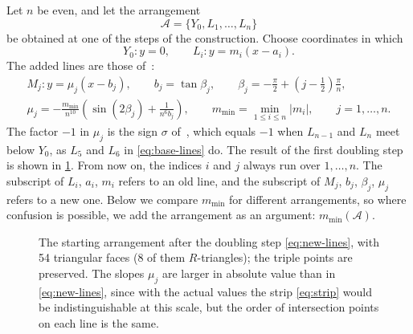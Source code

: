 Let $n$ be even, and let the arrangement
\[
\mathcal A=\{Y_0,L_1,\ldots,L_n\}
\]
be obtained at one of the steps of the construction. Choose coordinates in which
\[
Y_0:y=0,
\qquad
L_i:y=m_i(x-a_i).
\]
The added lines are those of~\cite[Prop.~3.1]{bbl}:
\begin{equation}\label{eq:new-lines}
\begin{gathered}
M_j:y=\mu_j\left(x-b_j\right),
\qquad
b_j=\tan\beta_j,
\qquad
\beta_j=-\frac\pi2+\left(j-\frac12\right)\frac\pi n,\\
\mu_j=-\frac{m_{\min}}{n^{10}}
\left(\sin(2\beta_j)+\frac1{n^6b_j}\right),
\qquad
m_{\min}=\min_{1\le i\le n}|m_i|,
\qquad
j=1,\ldots,n.
\end{gathered}
\end{equation}
The factor $-1$ in $\mu_j$ is the sign $\sigma$ of~\cite[Prop.~3.1]{bbl}, which equals $-1$ when $L_{n-1}$ and $L_n$ meet below $Y_0$, as $L_5$ and $L_6$ in \eqref{eq:base-lines} do.
The result of the first doubling step is shown in \cref{fig:double}.
From now on, the indices $i$ and $j$ always run over $1,\ldots,n$. The subscript of $L_i$, $a_i$, $m_i$ refers to an old line, and the subscript of $M_j$, $b_j$, $\beta_j$, $\mu_j$ refers to a new one.
Below we compare $m_{\min}$ for different arrangements, so where confusion is possible, we add the arrangement as an argument: $m_{\min}(\mathcal A)$.

\begin{figure}[t]
\centering
\resizebox{\ifdim\width>\linewidth\linewidth\else\width\fi}{!}{}
\caption{The starting arrangement after the doubling step \eqref{eq:new-lines}, with 54 triangular faces (8 of them $R$-triangles); the triple points are preserved.
The slopes $\mu_j$ are larger in absolute value than in \eqref{eq:new-lines}, since with the actual values the strip \eqref{eq:strip} would be indistinguishable at this scale, but the order of intersection points on each line is the same.}
\label{fig:double}
\end{figure}

